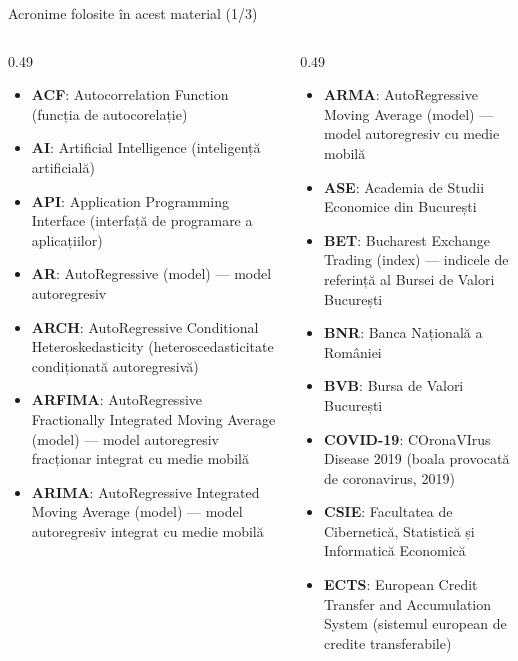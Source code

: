 {
\begin{frame}[noframenumbering]
    \titlepage
\end{frame}
}
\begin{frame}{Acronime folosite în acest material (1/3)}
\begin{columns}[T]
\begin{column}{0.49\textwidth}
\begin{itemize}\setlength{\itemsep}{0pt}
    \item \textbf{ACF}: Autocorrelation Function (funcția de autocorelație)
    \item \textbf{AI}: Artificial Intelligence (inteligență artificială)
    \item \textbf{API}: Application Programming Interface (interfață de programare a aplicațiilor)
    \item \textbf{AR}: AutoRegressive (model) — model autoregresiv
    \item \textbf{ARCH}: AutoRegressive Conditional Heteroskedasticity (heteroscedasticitate condiționată autoregresivă)
    \item \textbf{ARFIMA}: AutoRegressive Fractionally Integrated Moving Average (model) — model autoregresiv fracționar integrat cu medie mobilă
    \item \textbf{ARIMA}: AutoRegressive Integrated Moving Average (model) — model autoregresiv integrat cu medie mobilă
\end{itemize}
\end{column}
\begin{column}{0.49\textwidth}
\begin{itemize}\setlength{\itemsep}{0pt}
    \item \textbf{ARMA}: AutoRegressive Moving Average (model) — model autoregresiv cu medie mobilă
    \item \textbf{ASE}: Academia de Studii Economice din București
    \item \textbf{BET}: Bucharest Exchange Trading (index) — indicele de referință al Bursei de Valori București
    \item \textbf{BNR}: Banca Națională a României
    \item \textbf{BVB}: Bursa de Valori București
    \item \textbf{COVID-19}: COronaVIrus Disease 2019 (boala provocată de coronavirus, 2019)
    \item \textbf{CSIE}: Facultatea de Cibernetică, Statistică și Informatică Economică
    \item \textbf{ECTS}: European Credit Transfer and Accumulation System (sistemul european de credite transferabile)
\end{itemize}
\end{column}
\end{columns}
\end{frame}
